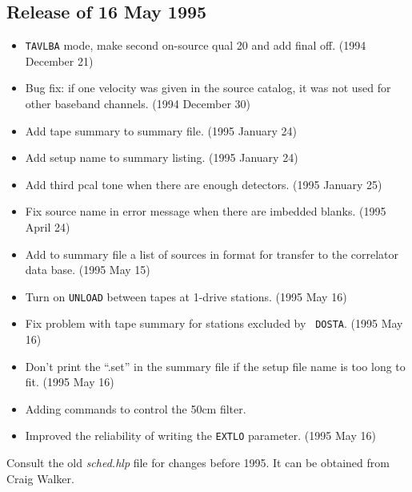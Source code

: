 \documentclass{report}
\begin{document}
\subsection{\label{SSSEC:16MAY95}Release of 16 May 1995}

\begin{itemize}
\item {\tt TAVLBA} mode, make second on-source qual 20 and add final
      off. (1994 December 21)

\item Bug fix: if one velocity was given in the source catalog, it
      was not used for other baseband channels. (1994 December 30)
\item Add tape summary to summary file. (1995 January 24)

\item Add setup name to summary listing. (1995 January 24)

\item Add third pcal tone when there are enough detectors.
      (1995 January 25)

\item Fix source name in error message when there are imbedded blanks.
      (1995 April 24)

\item Add to summary file a list of sources in format for transfer to
      the correlator data base. (1995 May 15)

\item Turn on {\tt UNLOAD} between tapes at 1-drive stations.
      (1995 May 16)

\item Fix problem with tape summary for stations excluded by {\tt
      DOSTA}. (1995 May 16)

\item Don't print the ``.set'' in the summary file if the setup file
      name is too long to fit. (1995 May 16)

\item Adding commands to control the 50cm filter.

\item Improved the reliability of writing the {\tt EXTLO} parameter.
      (1995 May 16)
\end{itemize}


Consult the old {\sl sched.hlp} file for changes before 1995.  It
can be obtained from Craig Walker.

\end{document}
